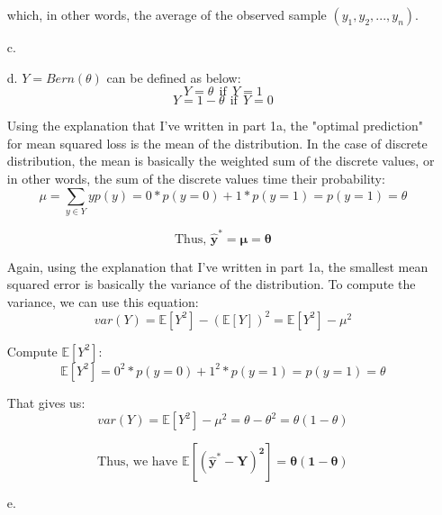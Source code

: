 \documentclass[twoside]{homework}
\begin{document}
\begin{itemize}
        which, in other words, the average of the observed sample $(y_1, y_2, ..., y_n)$.

        \item[c.]

        \item[d.] $Y=Bern(\theta)$ can be defined as below:
        $$Y=\theta \:\: \text{if} \:\: Y=1$$
        $$Y=1-\theta \:\: \text{if} \:\: Y=0$$

        Using the explanation that I've written in part 1a, the "optimal prediction" for mean squared loss is the mean of the distribution. In the case of discrete distribution, the mean is basically the weighted sum of the discrete values, or in other words, the sum of the discrete values time their probability:
        $$\mu=\sum_{y\in{Y}}yp(y)=0*p(y=0)+1*p(y=1)=p(y=1)=\theta$$

        $$\text{Thus, }\boldsymbol{\hat{y}^*=\mu=\theta}$$

        Again, using the explanation that I've written in part 1a, the smallest mean squared error is basically the variance of the distribution. To compute the variance, we can use this equation: $$var(Y)=\mathbb{E}[Y^2]-(\mathbb{E}[Y])^2=\mathbb{E}[Y^2]-\mu^2$$

        Compute $\mathbb{E}[Y^2]$:
        $$\mathbb{E}[Y^2]=0^2*p(y=0)+1^2*p(y=1)=p(y=1)=\theta$$

        That gives us:
        $$var(Y)=\mathbb{E}[Y^2]-\mu^2=\theta-\theta^2=\theta(1-\theta)$$

        $$\text{Thus, we have } \boldsymbol{\mathbb{E}[(\hat{y}^*-Y)^2]=\theta(1-\theta)}$$

        \item[e.]
\end{itemize}
\newpage
\end{document}
